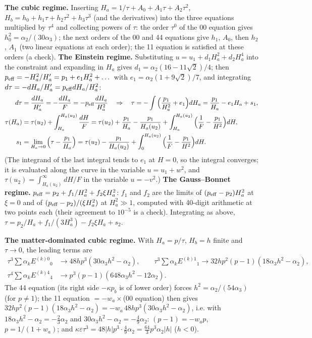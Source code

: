 \documentclass[10pt,a4paper]{article}
\begin{document}
\textbf{The cubic regime.} Inserting $H_a=1/\tau+A_0+A_1\tau+A_2\tau^2$, $H_b=h_0+h_1\tau+h_2\tau^2+h_3\tau^3$ (and the derivatives) into the three equations multiplied by $\tau^4$ and collecting powers of $\tau$: the order $\tau^0$ of the 00 equation gives $h_0^2=\alpha_2/(30\alpha_3)$; the next orders of the 00 and 44 equations give $h_1$, $A_0$, then $h_2$, $A_1$ (two linear equations at each order); the 11 equation is satisfied at these orders (a check). \textbf{The Einstein regime.} Substituting $u=u_1+d_1H_a^2+d_2H_a^4$ into the constraint and expanding in $H_a$ gives $d_1=\alpha_2(16-11\sqrt2)/4$; then $p_{\rm eff}=-H_a^2/H_a'=p_1+e_1H_a^2+\dots$ with $e_1=\alpha_2(1+9\sqrt2)/7$, and integrating $d\tau=-dH_a/H_a'=p_{\rm eff}dH_a/H_a^2$:
\begin{align*}
d\tau&=\frac{dH_a}{H_a'}=-\frac{dH_a}F=-p_{\rm eff}\frac{dH_a}{H_a^2}\quad\Rightarrow\quad \tau=-\int\Big(\frac{p_1}{H_a^2}+e_1\Big)dH_a=\frac{p_1}{H_a}-e_1H_a+s_1, \\
\tau(H_a)&=\tau(u_2)+\int_{H_a}^{H_a(u_2)}\frac{dH}F=\tau(u_2)+\frac{p_1}{H_a}-\frac{p_1}{H_a(u_2)}+\int_{H_a}^{H_a(u_2)}\Big(\frac1F-\frac{p_1}{H^2}\Big)dH, \\
s_1&=\lim_{H_a\to0}\Big(\tau-\frac{p_1}{H_a}\Big)=\tau(u_2)-\frac{p_1}{H_a(u_2)}+\int_0^{H_a(u_2)}\Big(\frac1F-\frac{p_1}{H^2}\Big)dH .
\end{align*}
(The integrand of the last integral tends to $e_1$ at $H=0$, so the integral converges; it is evaluated along the curve in the variable $u=u_1+w^2$, and $\tau(u_2)=\int_{H_a(u_2)}^\infty dH/F$ in the variable $u=-v^2$.) \textbf{The Gauss–Bonnet regime.} $p_{\rm eff}=p_2+f_1/H_a^2+f_2\xi H_a^2$: $f_1$ and $f_2$ are the limits of $(p_{\rm eff}-p_2)H_a^2$ at $\xi=0$ and of $(p_{\rm eff}-p_2)/(\xi H_a^2)$ at $H_a^2\gg1$, computed with 40-digit arithmetic at two points each (their agreement to $10^{-5}$ is a check). Integrating as above, $\tau=p_2/H_a+f_1/(3H_a^3)-f_2\xi H_a+s_2$.

\textbf{The matter-dominated cubic regime.} With $H_a=p/\tau$, $H_b=h$ finite and $\tau\to0$, the leading terms are
\begin{align*}
\tau^3\textstyle\sum\alpha_kE^{(k)0}{}_0&\to48hp^3(30\alpha_3h^2-\alpha_2),\qquad \tau^3\textstyle\sum\alpha_kE^{(k)1}{}_1\to32hp^2(p-1)(18\alpha_3h^2-\alpha_2), \\
\tau^4\textstyle\sum\alpha_kE^{(k)4}{}_4&\to p^3(p-1)(648\alpha_3h^2-12\alpha_2).
\end{align*}
The 44 equation (its right side $-\kappa p_b$ is of lower order) forces $h^2=\alpha_2/(54\alpha_3)$ (for $p\ne1$); the 11 equation $=-w_a\times$(00 equation) then gives $32hp^2(p-1)(18\alpha_3h^2-\alpha_2)=-w_a\,48hp^3(30\alpha_3h^2-\alpha_2)$, i.e. with $18\alpha_3h^2-\alpha_2=-\tfrac23\alpha_2$ and $30\alpha_3h^2-\alpha_2=-\tfrac49\alpha_2$: $(p-1)=-w_ap$, $p=1/(1+w_a)$; and $\kappa\varepsilon\tau^3=48|h|p^3\cdot\tfrac49\alpha_2=\tfrac{64}3p^3\alpha_2|h|$ ($h<0$).
\end{document}
